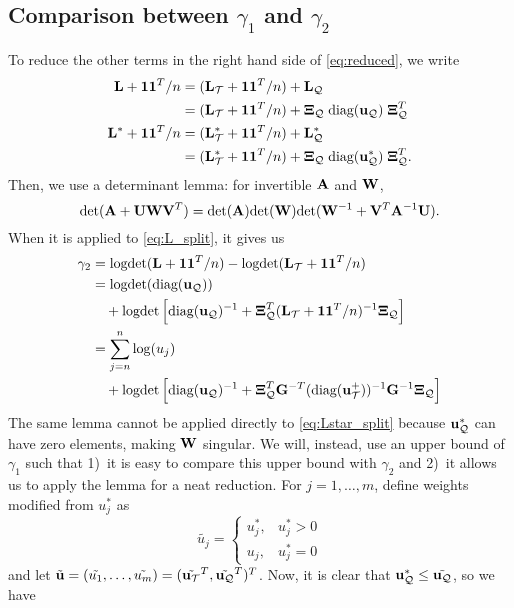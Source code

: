 \documentclass{article}
\begin{document}
\subsection{Comparison between $\gamma_1$ and $\gamma_2$}
To reduce the other terms in the right hand side of \eqref{eq:reduced}, we write
\begin{align}
\label{eq:L_split}
  {\bf L}+{\bf 1}{\bf 1}^T/n
  &= ({\bf L}_{\cal T}+{\bf 1}{\bf 1}^T/n)+{\bf L}_{\cal Q} \nonumber\\
  &= ({\bf L}_{\cal T}+{\bf 1}{\bf 1}^T/n)+\hbox{\boldmath$\Xi$}_{\cal Q}\;\text{diag}({\bf u}_{\cal Q})\;\hbox{\boldmath$\Xi$}_{\cal Q}^T \\
\label{eq:Lstar_split}
  {\bf L}^*+{\bf 1}{\bf 1}^T/n 
  &= ({\bf L}_{\cal T}^*+{\bf 1}{\bf 1}^T/n)+{\bf L}_{\cal Q}^* \nonumber\\
  &= ({\bf L}_{\cal T}^*+{\bf 1}{\bf 1}^T/n)+\hbox{\boldmath$\Xi$}_{\cal Q}\;\text{diag}({\bf u}_{\cal Q}^*)\;\hbox{\boldmath$\Xi$}_{\cal Q}^T.
\end{align}
Then, we use a determinant lemma: for invertible ${\bf A}$ and ${\bf W}$, 
\begin{equation}
\label{eq:det_lemma}
  {\hbox{det}}({\bf A}+{\bf U}{\bf W}{\bf V}^T)={\hbox{det}}({\bf A}){\hbox{det}}({\bf W}){\hbox{det}}({\bf W}^{-1}+{\bf V}^T{\bf A}^{-1}{\bf U}).
\end{equation}
When it is applied to \eqref{eq:L_split}, it gives us 
\begin{align}
  \gamma_2&=\text{logdet}({\bf L}+{\bf 1}{\bf 1}^T/n)-\text{logdet}({\bf L}_{\cal T}+{\bf 1}{\bf 1}^T/n) \nonumber\\
  &=\text{logdet}(\text{diag}({\bf u}_{\cal Q}))\nonumber\\
  &\quad +\text{logdet}\left[\text{diag}({\bf u}_{\cal Q})^{-1}
  +\hbox{\boldmath$\Xi$}_{\cal Q}^T({\bf L}_{\cal T}+{\bf 1}{\bf 1}^T/n)^{-1}\hbox{\boldmath$\Xi$}_{\cal Q}\right]\nonumber\\
\label{eq:gamma2}
  &=\sum_{j=n}^n\log(u_j) \nonumber\\
  &\quad +\text{logdet}\left[\text{diag}({\bf u}_{\cal Q})^{-1}+\hbox{\boldmath$\Xi$}_{\cal Q}^T{\bf G}^{-T}(\text{diag}({\bf u}_{\cal T}^+))^{-1}{\bf G}^{-1}\hbox{\boldmath$\Xi$}_{\cal Q}\right]
\end{align}
The same lemma cannot be applied directly to \eqref{eq:Lstar_split} because ${\bf u}_{\cal Q}^*$ can have zero elements, making ${\bf W}$ singular. We will, instead, use an upper bound of $\gamma_1$ such that 1)~it is easy to compare this upper bound with $\gamma_2$ and 2)~it allows us to apply the lemma for a neat reduction. For $j=1,\dots,m$, define weights modified from $u_j^*$ as
\[
  \tilde{u_j}=\left\{\begin{array}{ll} u_j^*, & u_j^*>0 \\ u_j, & u_j^*=0 \end{array}\right.
\]
and let $\tilde{{\bf u}}=(\tilde{u_1},\dots,\tilde{u_m})=(\tilde{{\bf u}_{\cal T}}^T,\tilde{{\bf u}_{\cal Q}}^T)^T$. Now, it is clear that ${\bf u}_{\cal Q}^*\leq\tilde{{\bf u}_{\cal Q}}$, so we have
\end{document}
